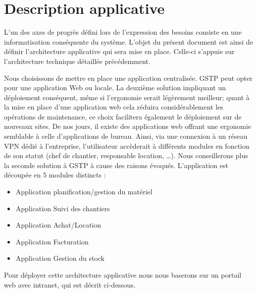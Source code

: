\section{Description applicative}
        L’un des axes de progrès défini lors de l’expression des besoins consiste en une informatisation conséquente du système. L’objet du présent document est ainsi de définir l’architecture applicative qui sera mise en place. Celle-ci s’appuie sur l’architecture technique détaillée précédemment.

        Nous choisissons de mettre en place une application centralisée. GSTP peut opter pour une application Web ou locale. La deuxième solution impliquant un déploiement conséquent, même si l'ergonomie serait légèrement meilleur; quant à la mise en place d'une application web cela réduira considérablement les opérations de maintenance, ce choix facilitera également le déploiement sur de nouveaux sites. De nos jours, il existe des applications web offrant une ergonomie semblable à celle d'applications de bureau. Ainsi, via une connexion à un réseau VPN dédié à l’entreprise, l’utilisateur accèderait à différents modules en fonction de son statut (chef de chantier, responsable location, …). Nous conseillerons plus la seconde solution à GSTP à cause des raisons évoqués.
L’application est découpée en 5 modules distincts :
\begin{itemize}
	\item Application planification/gestion du matériel
	\item Application Suivi des chantiers
	\item Application Achat/Location
	\item Application Facturation
	\item Application Gestion du stock
\end{itemize}

Pour déployer cette architecture applicative nous nous baserons sur un portail web avec intranet, qui est décrit ci-dessous.


